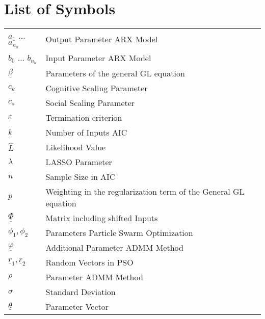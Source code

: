 \chapter*{List of Symbols}


\begin{tabular}{ll} 


$a_1$ ... $a_{n_a}$ &  Output Parameter ARX Model \\
$b_0$ ... $b_{n_b}$ &  Input Parameter ARX Model \\
$\underline{\beta}$ & Parameters of the general GL equation  \\
$c_k$ & Cognitive Scaling Parameter \\
$c_s$ & Social Scaling Parameter  \\
$\varepsilon$ & Termination criterion  \\
$k$ & Number of Inputs AIC   \\
$\hat{L}$ & Likelihood Value  \\
$\lambda$ & LASSO Parameter  \\
$n$ & Sample Size in AIC   \\
$p$ & Weighting in the regularization term of the General GL equation  \\
$\underline{\underline{\Phi}}$ & Matrix including shifted Inputs  \\
$\phi_1 ,\phi_2$ & Parameters Particle Swarm Optimization  \\
$\underline{\varphi}$ & Additional Parameter ADMM Method  \\
$\underline{r}_1,\underline{r}_2$ & Random Vectors in PSO  \\
$\rho$ & Parameter ADMM Method \\
$\sigma$ & Standard Deviation  \\
$\underline{\theta}$ & Parameter Vector  \\
\end{tabular}
\label{tab:einflusparameter}

\newpage

